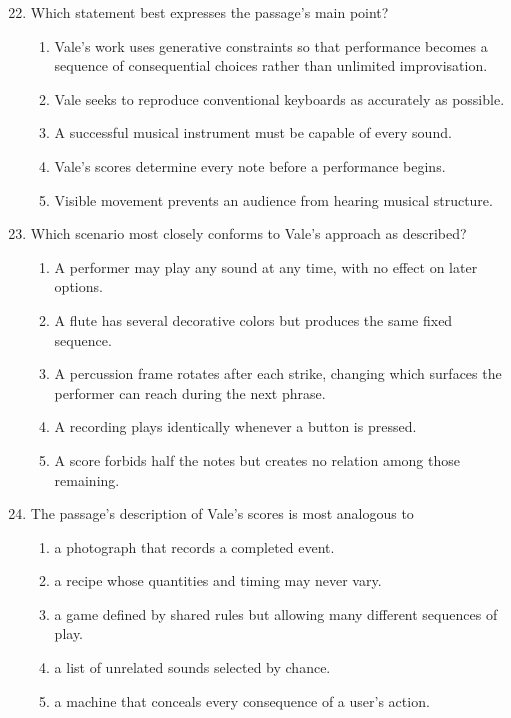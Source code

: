 \begin{enumerate}
\setcounter{enumi}{21}
\item Which statement best expresses the passage's main point?
  \begin{enumerate}
  \item Vale's work uses generative constraints so that performance becomes a
        sequence of consequential choices rather than unlimited improvisation.
  \item Vale seeks to reproduce conventional keyboards as accurately as possible.
  \item A successful musical instrument must be capable of every sound.
  \item Vale's scores determine every note before a performance begins.
  \item Visible movement prevents an audience from hearing musical structure.
  \end{enumerate}

\item Which scenario most closely conforms to Vale's approach as described?
  \begin{enumerate}
  \item A performer may play any sound at any time, with no effect on later options.
  \item A flute has several decorative colors but produces the same fixed sequence.
  \item A percussion frame rotates after each strike, changing which surfaces the
        performer can reach during the next phrase.
  \item A recording plays identically whenever a button is pressed.
  \item A score forbids half the notes but creates no relation among those remaining.
  \end{enumerate}

\item The passage's description of Vale's scores is most analogous to
  \begin{enumerate}
  \item a photograph that records a completed event.
  \item a recipe whose quantities and timing may never vary.
  \item a game defined by shared rules but allowing many different sequences of play.
  \item a list of unrelated sounds selected by chance.
  \item a machine that conceals every consequence of a user's action.
  \end{enumerate}


\end{enumerate}
